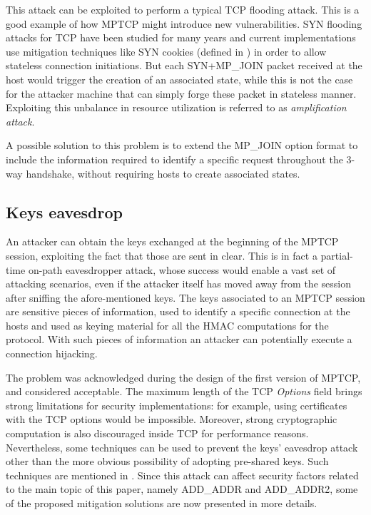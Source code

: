 This attack can be exploited to perform a typical TCP flooding attack. This is a good example of how MPTCP might introduce new vulnerabilities. 
SYN flooding attacks for TCP have been studied for many years and current implementations use mitigation techniques like SYN cookies (defined in ) in order to allow stateless connection initiations. But each SYN+MP\_JOIN packet received at the host would trigger the creation of an associated state, while this is not the case for the attacker machine that can simply forge these packet in stateless manner. Exploiting this unbalance in resource utilization is referred to as \textit{amplification attack}.

A possible solution to this problem is to extend the MP\_JOIN option format to include the information required to identify a specific request throughout the 3-way handshake, without requiring hosts to create associated states.

\subsection{Keys eavesdrop}
\label{keyseav}
An attacker can obtain the keys exchanged at the beginning of the MPTCP session, exploiting the fact that those are sent in clear. This is in fact a partial-time on-path eavesdropper attack, whose success would enable a vast set of attacking scenarios, even if the attacker itself has moved away from the session after sniffing the afore-mentioned keys.
The keys associated to an MPTCP session are sensitive pieces of information, used to identify a specific connection at the hosts and used as keying material for all the HMAC computations for the protocol. With such pieces of information an attacker can potentially execute a connection hijacking.  

The problem was acknowledged during the design of the first version of MPTCP, and considered acceptable. The maximum length of the TCP \textit{Options} field brings strong limitations for security implementations: for example, using certificates with the TCP options would be impossible. Moreover, strong cryptographic computation is also discouraged inside TCP for performance reasons. Nevertheless, some techniques can be used to prevent the keys' eavesdrop attack other than the more obvious possibility of adopting pre-shared keys. Such techniques are mentioned in . Since this attack can affect security factors related to the main topic of this paper, namely ADD\_ADDR and ADD\_ADDR2, some of the proposed mitigation solutions are now presented in more details.

